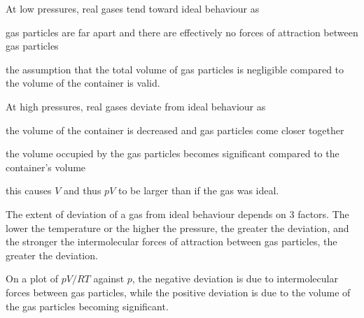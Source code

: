 \documentclass[Chemistry.tex]{subfiles}
\begin{document}
At low pressures, real gases tend toward ideal behaviour as \begin{slinenum}
\item gas particles are far apart and there are effectively no forces of attraction between gas particles
\item the assumption that the total volume of gas particles is negligible compared to the volume of the container is valid.
\end{slinenum}

At high pressures, real gases deviate from ideal behaviour as \begin{slinenum}
\item the volume of the container is decreased and gas particles come closer together
\item the volume occupied by the gas particles becomes significant compared to the container's volume
\item this causes \(V\) and thus \(pV\) to be larger than if the gas was ideal.
\end{slinenum}

The extent of deviation of a gas from ideal behaviour depends on 3 factors. The lower the temperature or the higher the pressure, the greater the deviation, and the stronger the intermolecular forces of attraction between gas particles, the greater the deviation.

On a plot of \(pV/RT\) against \(p\), the negative deviation is due to intermolecular forces between gas particles, while the positive deviation is due to the volume of the gas particles becoming significant.
\end{document}

